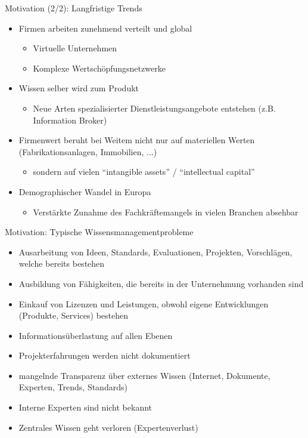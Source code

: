 \documentclass[aspectratio=1610,onlymath]{beamer}
\begin{document}
\begin{frame}[fragile]{Motivation (2/2): Langfristige Trends}

\begin{itemize}
\item Firmen arbeiten zunehmend verteilt und global
	\begin{itemize}
	\item Virtuelle Unternehmen
	\item Komplexe Wertschöpfungsnetzwerke
	\end{itemize}
\item Wissen selber wird zum Produkt
	\begin{itemize}
	\item Neue Arten spezialisierter Dienstleistungsangebote entstehen (z.B. Information Broker)
	\end{itemize}
\item Firmenwert beruht bei Weitem nicht nur auf materiellen Werten (Fabrikationsanlagen, Immobilien, ...) 
	\begin{itemize}
	\item sondern auf vielen ``intangible assets'' / ``intellectual capital''
	\end{itemize}
\item Demographischer Wandel in Europa 
	\begin{itemize}
	\item Verstärkte Zunahme des Fachkräftemangels in vielen Branchen absehbar
	\end{itemize} 
\end{itemize}

\bigskip
{}

\end{frame}


\begin{frame}{Motivation: Typische Wissensmanagementprobleme}
\begin{itemize}
	\item Ausarbeitung von Ideen, Standards, Evaluationen, Projekten, Vorschlägen, welche bereits bestehen
	\item Ausbildung von \alert{Fähigkeiten}, die bereits in der Unternehmung vorhanden sind
	\item Einkauf von Lizenzen und Leistungen, obwohl eigene Entwicklungen (Produkte, Services) bestehen
	\item \alert{Informationsüberlastung} auf allen Ebenen
	\item Projekterfahrungen werden \alert{nicht dokumentiert}
	\item \alert{mangelnde Transparenz} über externes Wissen (Internet, Dokumente, Experten, Trends, Standards)
	\item Interne Experten sind nicht bekannt
	\item Zentrales Wissen geht verloren (\alert{Expertenverlust})
\end{itemize}
\end{frame}
\end{document}
